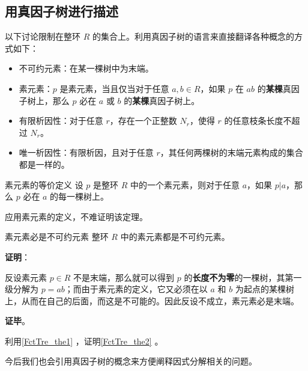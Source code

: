 

\subsection{用真因子树进行描述}

以下讨论限制在整环 $R$ 的集合上。利用真因子树的语言来直接翻译各种概念的方式如下：

\begin{definition}{}\label{FctTre_def1}
\begin{itemize}
\item 不可约元素：在某一棵树中为末端。
\item 素元素：$p$ 是素元素，当且仅当对于任意 $a, b\in R$，如果 $p$ 在 $ab$ 的\textbf{某棵}真因子树上，那么 $p$ 必在 $a$ 或 $b$ 的\textbf{某棵}真因子树上。
\item 有限析因性：对于任意 $r$，存在一个正整数 $N_r$，使得 $r$ 的任意枝条长度不超过 $N_r$。
\item 唯一析因性：有限析因，且对于任意 $r$，其任何两棵树的末端元素构成的集合都是一样的。
\end{itemize}
\end{definition}

\begin{theorem}{素元素的等价定义}\label{FctTre_the1}
设 $p$ 是整环 $R$ 中的一个素元素，则对于任意 $a$，如果 $p|a$，那么 $p$ 必在 $a$ 的每一棵树上。
\end{theorem}

应用素元素的定义，不难证明该定理。


\begin{theorem}{素元素必是不可约元素}\label{FctTre_the2}
整环 $R$ 中的素元素都是不可约元素。
\end{theorem}

\textbf{证明}：

反设素元素 $p\in R$ 不是末端，那么就可以得到 $p$ 的\textbf{长度不为零}的一棵树，其第一级分解为 $p=ab$；而由于素元素的定义，它又必须在以 $a$ 和 $b$ 为起点的某棵树上，从而在自己的后面，而这是不可能的。因此反设不成立，素元素必是末端。

\textbf{证毕}。

\begin{exercise}{}\label{FctTre_exe1}
利用\autoref{FctTre_the1} ，证明\autoref{FctTre_the2} 。
\end{exercise}

今后我们也会引用真因子树的概念来方便阐释因式分解相关的问题。

